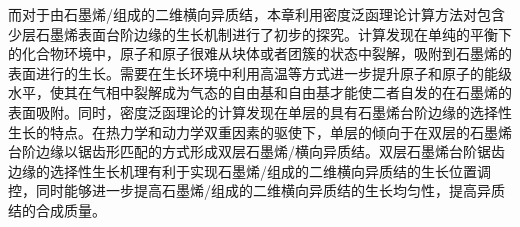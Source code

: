     而对于由石墨烯/组成的二维横向异质结，本章利用密度泛函理论计算方法对包含少层石墨烯表面台阶边缘的生长机制进行了初步的探究。计算发现在单纯的平衡下的化合物环境中，原子和原子很难从块体或者团簇的状态中裂解，吸附到石墨烯的表面进行的生长。需要在生长环境中利用高温等方式进一步提升原子和原子的能级水平，使其在气相中裂解成为气态的自由基和自由基才能使二者自发的在石墨烯的表面吸附。同时，密度泛函理论的计算发现在单层的具有石墨烯台阶边缘的选择性生长的特点。在热力学和动力学双重因素的驱使下，单层的倾向于在双层的石墨烯台阶边缘以锯齿形匹配的方式形成双层石墨烯/横向异质结。双层石墨烯台阶锯齿边缘的选择性生长机理有利于实现石墨烯/组成的二维横向异质结的生长位置调控，同时能够进一步提高石墨烯/组成的二维横向异质结的生长均匀性，提高异质结的合成质量。